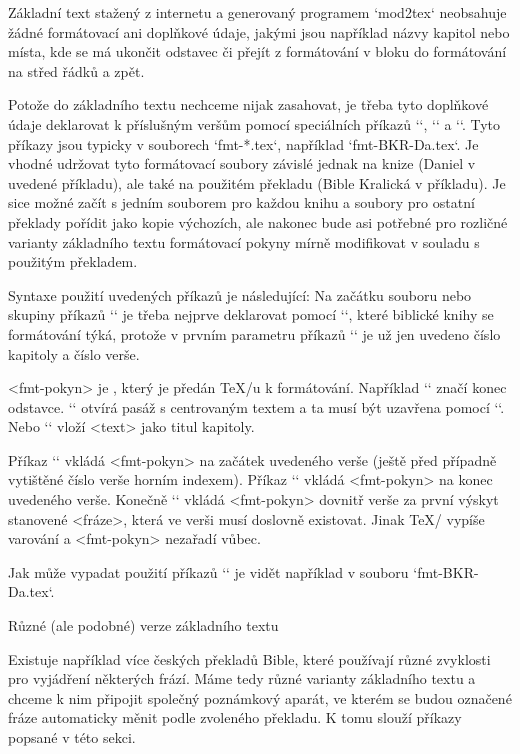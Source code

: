 Základní text stažený z internetu a generovaný programem `mod2tex` neobsahuje
žádné formátovací ani doplňkové údaje, jakými jsou například názvy kapitol
nebo místa, kde se má ukončit odstavec či přejít z formátování v bloku do
formátování na střed řádků a zpět.

Potože do základního textu nechceme nijak zasahovat, je třeba tyto doplňkové
údaje deklarovat k příslušným veršům pomocí speciálních příkazů `\fmtadd`,
`\fmtpre` a `\fmtins`. Tyto příkazy jsou typicky v souborech `fmt-*.tex`,
například `fmt-BKR-Da.tex`. Je vhodné udržovat tyto formátovací soubory
závislé jednak na knize (Daniel v uvedené příkladu), ale také na použitém
překladu (Bible Kralická v příkladu). Je sice možné začít s jedním souborem
pro každou knihu a soubory pro ostatní překlady pořídit jako kopie výchozích,
ale nakonec bude asi potřebné pro rozličné varianty základního textu
formátovací pokyny mírně modifikovat v souladu s použitým překladem.

Syntaxe použití uvedených příkazů je následující:
\begtt
{}
\endtt
Na začátku souboru nebo skupiny
příkazů `\fmt*` je třeba nejprve deklarovat pomocí `\FormatedBook`, které
biblické knihy se formátování týká, protože v prvním parametru příkazů `\fmt*` je už
jen uvedeno číslo kapitoly a číslo verše. 

<fmt-pokyn> je , který je předán \TeX/u k formátování.
Například `\endgraf` značí konec odstavce. `\begcenter` otvírá pasáž s
centrovaným textem a ta musí být uzavřena pomocí `\endcenter`. Nebo 
`` vloží <text> jako titul kapitoly.

Příkaz `\fmtpre` vkládá <fmt-pokyn>
na začátek uvedeného verše (ještě před případně vytištěné číslo verše horním
indexem). Příkaz `\fmtadd` vkládá <fmt-pokyn> na konec uvedeného verše.
Konečně `\fmtins` vkládá <fmt-pokyn> dovnitř verše za první výskyt stanovené
<fráze>, která ve verši musí doslovně existovat. Jinak \TeX/ vypíše varování
a <fmt-pokyn> nezařadí vůbec.

Jak může vypadat použití příkazů `\fmt*` je vidět například v souboru
`fmt-BKR-Da.tex`.


 Různé (ale podobné) verze základního textu

Existuje například více českých překladů Bible, které používají různé zvyklosti pro
vyjádření některých frází. Máme tedy různé varianty základního textu a
chceme k nim připojit společný poznámkový aparát, ve kterém se budou
označené fráze automaticky měnit podle zvoleného překladu. K tomu slouží příkazy
popsané v této sekci.

